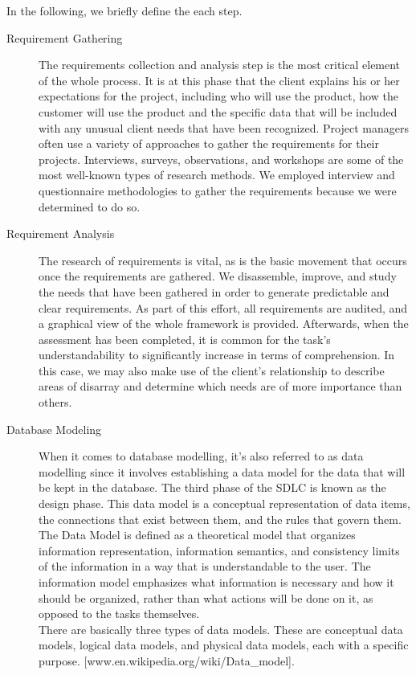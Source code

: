 In the following, we briefly define the each step.
\begin{description}
\item [Requirement Gathering] The requirements collection and analysis step is the most critical element of the whole process. It is at this phase that the client explains his or her expectations for the project, including who will use the product, how the customer will use the product and the specific data that will be included with any unusual client needs that have been recognized. Project managers often use a variety of approaches to gather the requirements for their projects. Interviews, surveys, observations, and workshops are some of the most well-known types of research methods. We employed interview and questionnaire methodologies to gather the requirements because we were determined to do so.
\item[Requirement Analysis] The research of requirements is vital, as is the basic movement that occurs once the requirements are gathered. We disassemble, improve, and study the needs that have been gathered in order to generate predictable and clear requirements. As part of this effort, all requirements are audited, and a graphical view of the whole framework is provided. Afterwards, when the assessment has been completed, it is common for the task's understandability to significantly increase in terms of comprehension. In this case, we may also make use of the client's relationship to describe areas of disarray and determine which needs are of more importance than others.
\item[Database Modeling] When it comes to database modelling, it's also referred to as data modelling since it involves establishing a data model for the data that will be kept in the database. The third phase of the SDLC is known as the design phase. This data model is a conceptual representation of data items, the connections that exist between them, and the rules that govern them. The Data Model is defined as a theoretical model that organizes information representation, information semantics, and consistency limits of the information in a way that is understandable to the user. The information model emphasizes what information is necessary and how it should be organized, rather than what actions will be done on it, as opposed to the tasks themselves.\\

There are basically three types of data models. These are conceptual data models, logical data models, and physical data models,  each with a specific purpose. [www.en.wikipedia.org/wiki/Data\_model].\\


\end{description}
